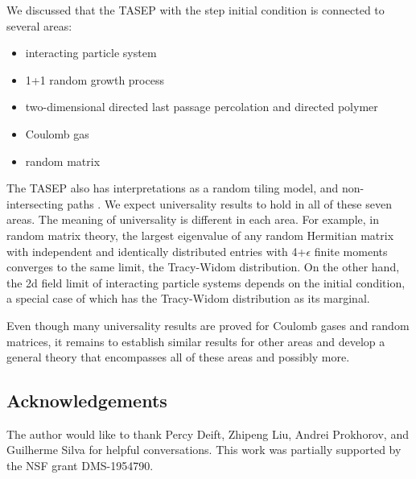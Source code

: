 \documentclass[10pt]{article}
\theoremstyle{plain}
\theoremstyle{definition}
\numberwithin{equation}{section}
\begin{document}
We discussed that the TASEP with the step initial condition is connected to several areas: 
\begin{itemize}
\item interacting particle system
\item 1+1 random growth process
\item two-dimensional directed last passage percolation and directed polymer
\item Coulomb gas
\item random matrix
\end{itemize}
The TASEP also has interpretations as a random tiling model, and non-intersecting paths \cite{Johansson02, Gorin21}. 
We expect universality results to hold in all of these seven areas. 
The meaning of universality is  different in each area. For example, in random matrix theory, the largest eigenvalue of any random Hermitian matrix with independent and identically distributed entries with 4+$\epsilon$ finite moments converges to the same limit, the Tracy-Widom distribution. 
On the other hand, the 2d field limit of interacting particle systems depends on the initial condition, a special case of which has the Tracy-Widom distribution as its marginal. 

Even though many universality results are proved for Coulomb gases and random matrices, it remains to establish similar results for other areas and develop a general theory that encompasses all of these areas and possibly more.  






\subsection*{Acknowledgements}


The author would like to thank Percy Deift, Zhipeng Liu, Andrei Prokhorov, and Guilherme Silva for helpful conversations. 
This work was partially supported by the NSF grant DMS-1954790.  




%
\end{document}
